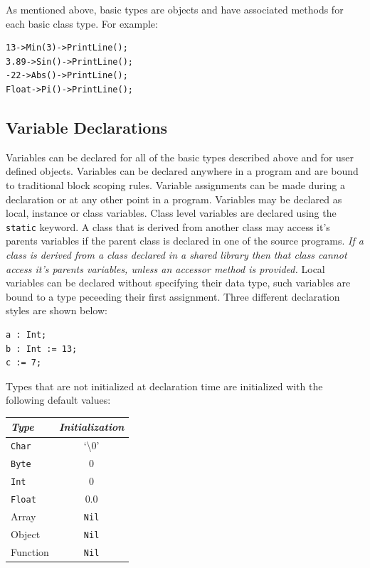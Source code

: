 \documentclass[12pt]{article}
\begin{document}
As mentioned above, basic types are objects and have associated methods for each basic class type.  For example:

\begin{verbatim}
13->Min(3)->PrintLine();
3.89->Sin()->PrintLine();
-22->Abs()->PrintLine();
Float->Pi()->PrintLine();
\end{verbatim}

\subsection{Variable Declarations}
Variables can be declared for all of the basic types described above and for user defined objects. Variables can be declared anywhere in a program and are bound to traditional block scoping rules.  Variable assignments can be made during a declaration or at any other point in a program. Variables may be declared as local, instance or class variables.  Class level variables are declared using the \texttt{static} keyword. A class that is derived from another class may access it's parents variables if the parent class is declared in one of the source programs.  \textit{If a class is derived from a class declared in a shared library then that class cannot access it's parents variables, unless an accessor method is provided.}  Local variables can be declared without specifying their data type, such variables are bound to a type peceeding their first assignment. Three different declaration styles are shown below:

\begin{verbatim}
a : Int;
b : Int := 13;
c := 7;
\end{verbatim}

Types that are not initialized at declaration time are initialized with the following default values:

\vspace{\baselineskip}
\begin{center}
\begin{tabular}{| l | c |}
\hline
\emph{Type} & \emph{Initialization} \\ \hline \hline
\texttt{Char} & `\textbackslash0' \\ \hline
\texttt{Byte} & 0 \\ \hline
\texttt{Int} & 0 \\ \hline
\texttt{Float} & 0.0 \\ \hline
Array & \texttt{Nil} \\ \hline
Object & \texttt{Nil} \\ \hline
Function & \texttt{Nil} \\ \hline
\end{tabular}
\end{center}
\end{document}
